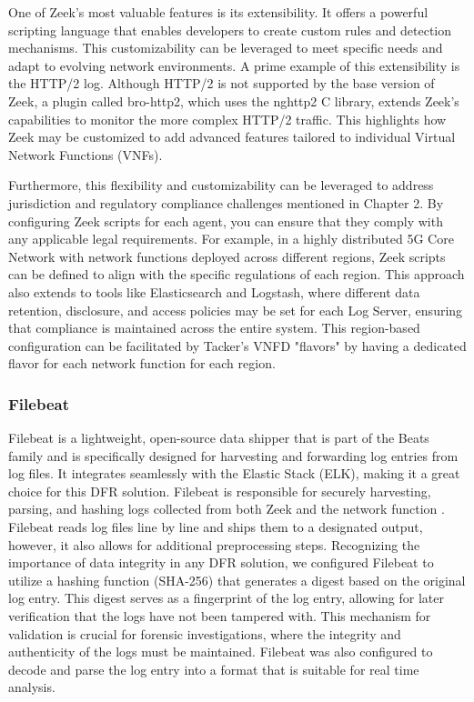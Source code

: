 \documentclass[final,1p,times,authoryear]{elsarticle}
\begin{document}
\vspace{1em}

One of Zeek's most valuable features is its extensibility. It offers a powerful scripting language that enables developers to create custom rules and detection mechanisms. This customizability can be leveraged to meet specific needs and adapt to evolving network environments. A prime example of this extensibility is the HTTP/2 log. Although HTTP/2 is not supported by the base version of Zeek, a plugin called bro-http2, which uses the nghttp2 C library, extends Zeek's capabilities to monitor the more complex HTTP/2 traffic. This highlights how Zeek may be customized to add advanced features tailored to individual Virtual Network Functions (VNFs).

\vspace{1em}

Furthermore, this flexibility and customizability can be leveraged to address jurisdiction and regulatory compliance challenges mentioned in Chapter 2. By configuring Zeek scripts for each agent, you can ensure that they comply with any applicable legal requirements. For example, in a highly distributed 5G Core Network with network functions deployed across different regions, Zeek scripts can be defined to align with the specific regulations of each region. This approach also extends to tools like Elasticsearch and Logstash, where different data retention, disclosure, and access policies may be set for each Log Server, ensuring that compliance is maintained across the entire system. This region-based configuration can be facilitated by Tacker's VNFD "flavors" by having a dedicated flavor for each network function for each region.

\subsubsection{Filebeat}
\label{sub3sub3sec2}
Filebeat is a lightweight, open-source data shipper that is part of the Beats family and is specifically designed for harvesting and forwarding log entries from log files. It integrates seamlessly with the Elastic Stack (ELK), making it a great choice for this DFR solution. Filebeat is responsible for securely harvesting, parsing, and hashing logs collected from both Zeek and the network function . Filebeat reads log files line by line and ships them to a designated output, however, it also allows for additional preprocessing steps. Recognizing the importance of data integrity in any DFR solution, we configured Filebeat to utilize a hashing function (SHA-256) that generates a digest based on the original log entry. This digest serves as a fingerprint of the log entry, allowing for later verification that the logs have not been tampered with. This mechanism for validation is crucial for forensic investigations, where the integrity and authenticity of the logs must be maintained. Filebeat was also configured to decode and parse the log entry into a format that is suitable for real time analysis.
\end{document}
